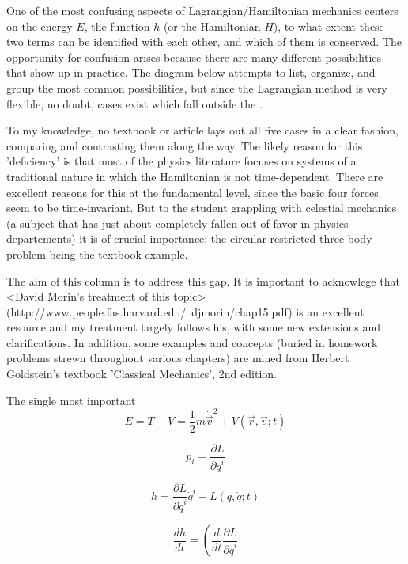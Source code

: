 \documentclass[12pt]{article}
\begin{document}
One of the most confusing aspects of Lagrangian/Hamiltonian mechanics centers on the energy $E$, the function $h$ (or the Hamiltonian $H$), to what extent these two terms can be identified with each other, and which of them is conserved.  The opportunity for confusion arises because there are many different possibilities that show up in practice.  The diagram below attempts to list, organize, and group the most common possibilities, but since the Lagrangian method is very flexible, no doubt, cases exist which fall outside the .



To my knowledge, no textbook or article lays out all five cases in a clear fashion, comparing and contrasting them along the way.  The likely reason for this 'deficiency' is that most of the physics literature focuses on systems of a traditional nature in which the Hamiltonian is not time-dependent.  There are excellent reasons for this at the fundamental level, since the basic four forces seem to be time-invariant.  But to the student grappling with celestial mechanics (a subject that has just about completely fallen out of favor in physics departements) it is of crucial importance; the circular restricted three-body problem being the textbook example.  

The aim of this column is to address this gap.  It is important to acknowlege that <David Morin's treatment of this topic> (http://www.people.fas.harvard.edu/~djmorin/chap15.pdf) is an excellent resource and my treatment largely follows his, with some new extensions and clarifications.  In addition, some examples and concepts (buried in homework problems strewn throughout various chapters) are mined from Herbert Goldstein's textbook 'Classical Mechanics', 2nd edition.

The single most important 
\[ E = T + V = \frac{1}{2} m \dot {\vec v} ^2 + V(\vec r, \vec v; t) \]

\[ p_i = \frac{\partial L}{\partial {\dot q}^i} \]

\[ h = \frac{\partial L}{\partial {\dot q}^i} {\dot q}^i - L(q,\dot q;t) \]

\[ \frac{d h}{dt} = \left( \frac{d}{dt} \frac{\partial L}{\partial {\dot q}^i} \]
\end{document}
